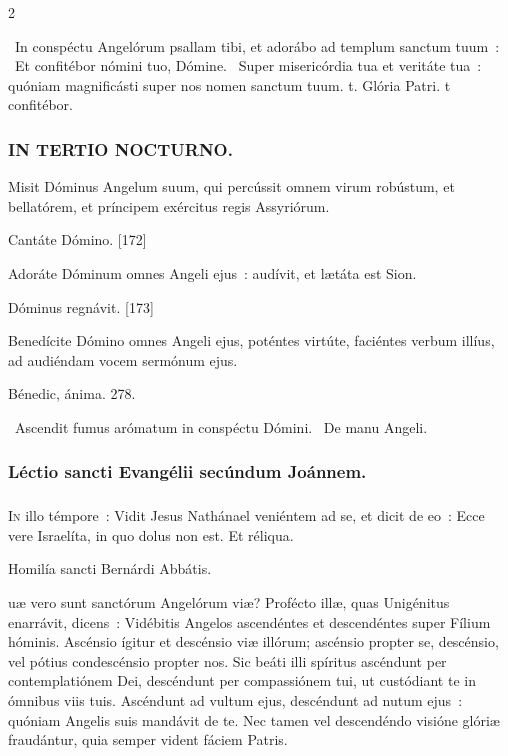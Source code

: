 \documentclass[9pt,twoside]{extarticle}
\begin{document}
\begin{multicols}{2}
{\begin{tightlist}{}
\item {}~In conspéctu Angelórum psallam tibi, et adorábo ad templum sanctum tuum~: \textred{*}~Et confitébor nómini tuo, Dómine. ~Super misericórdia tua et veritáte tua~: quóniam magnificásti super nos nomen sanctum tuum. t. Glória Patri. t confitébor.
\end{tightlist}

\subsubsection*{\center \textsc{IN TERTIO NOCTURNO.}}
\begin{tightlist}{}
\item {} Misit Dóminus Angelum suum, qui percússit omnem virum robústum, et bellatórem, et príncipem exércitus regis Assyriórum.
\item {} Cantáte Dómino. [172]
\item {} Adoráte Dóminum omnes Angeli ejus~: audívit, et lætáta est Sion.
\item {} Dóminus regnávit. [173]
\item {} Benedícite Dómino omnes Angeli ejus, poténtes virtúte, faciéntes verbum illíus, ad audiéndam vocem sermónum ejus.
\item {} Bénedic, ánima. 278.
\item {}~Ascendit fumus arómatum in conspéctu Dómini. ~De manu Angeli.
\end{tightlist}

\subsubsection*{\center Léctio sancti Evangélii secúndum Joánnem.}
\subsubsection*{\center {}}
\lettrine{I}n illo témpore~: Vidit Jesus Nathánael veniéntem ad se, et dicit de eo~: Ecce vere Israelíta, in quo dolus non est. Et réliqua.

\begin{center}Homilía sancti Bernárdi Abbátis.\\
\end{center}
uæ vero sunt sanctórum Angelórum viæ? Profécto illæ, quas Unigénitus enarrávit, dicens~: Vidébitis Angelos ascendéntes et descendéntes super Fílium hóminis. Ascénsio ígitur et descénsio viæ illórum; ascénsio propter se, descénsio, vel pótius condescénsio propter nos. Sic beáti illi spíritus ascéndunt per contemplatiónem Dei, descéndunt per compassiónem tui, ut custódiant te in ómnibus viis tuis. Ascéndunt ad vultum ejus, descéndunt ad nutum ejus~: quóniam Angelis suis mandávit de te. Nec tamen vel descendéndo visióne glóriæ fraudántur, quia semper vident fáciem Patris.

}
\end{multicols}
\end{document}

